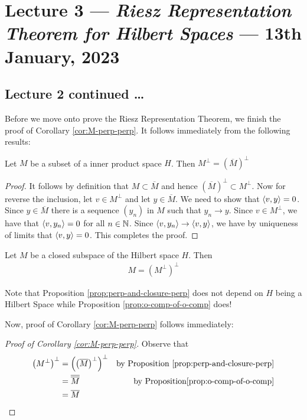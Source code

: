 \section{Lecture 3 --- \textit{Riesz Representation Theorem for Hilbert Spaces} --- 13th January, 2023}

\subsection{Lecture 2 continued \ldots}
Before we move onto prove the Riesz Representation Theorem, we finish the proof of Corollary \ref{cor:M-perp-perp}. It follows immediately from the following results:

\begin{proposition}
    Let $M$ be a subset of a inner product space $H$. Then $M^{\perp} =  \left( \overline{M} \right)^{\perp}$
    \label{prop:perp-and-closure-perp}
\end{proposition}
\begin{proof}
    It follows by definition that $M \subset \overline M$ and hence $\left( \overline M \right)^{\perp} \subset M^{\perp}$. Now for reverse the inclusion, let $v \in M^{\perp}$ and let $y \in \overline M$. We need to show that $\left\langle v,y \right\rangle = 0$. Since $y\in \overline M$ there is a sequence $\left( y_{n} \right)$ in $M$ such that $y_{n} \to y$. Since $v \in M^{\perp}$, we have that $\left\langle v , y_{n} \right\rangle=0 $ for all $n\in \mathbb N$. Since $\left\langle v, y_{n} \right\rangle \to \left\langle v,y \right\rangle$, we have by uniqueness of limits that $\left\langle v,y \right\rangle = 0$. This completes the proof.
\end{proof}

\begin{proposition}
    Let $M$ be a closed subspace of the Hilbert space $H$. Then 
    \begin{align*}
	M = \left( M^{\perp} \right) ^{\perp}
    \end{align*}
    \label{prop:o-comp-of-o-comp}
\end{proposition}

Note that Proposition \ref{prop:perp-and-closure-perp} does not depend on $H$ being a Hilbert Space while Proposition \ref{prop:o-comp-of-o-comp} does!

Now, proof of Corollary \ref{cor:M-perp-perp} follows immediately:
\begin{proof}[Proof of Corollary \ref{cor:M-perp-perp}]
    Observe that
    \begin{align*}
    \left( M^{\perp} \right) ^{\perp} &= \left( \left( \overline M \right) ^{\perp} \right) ^{\perp} & \text{by Proposition } \ref{prop:perp-and-closure-perp} \\
    &= \overline{\overline{M}} & \text{by Proposition} \ref{prop:o-comp-of-o-comp} \\
    &= \overline M
    \end{align*}
\end{proof}

